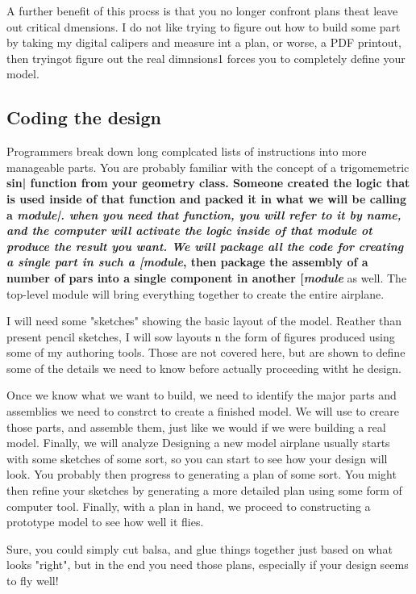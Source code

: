 A further benefit of this procss is that you no longer confront plans theat leave out critical dmensions. I do not like trying to figure out how to build some part by taking my digital calipers and measure int a plan, or worse, a  PDF printout, then tryingot figure out the real dimnsions1 \osc forces you to completely define your model.

\subsection{Coding the design}

Programmers break down long complcated lists of instructions into more manageable parts. You are probably familiar with the concept of a trigomemetric {\bf sin| function from your geometry class. Someone created the logic that is used inside of that function and packed it in what we will be calling a {\it module|. when you need that function, you will refer to it by name, and the computer will activate the logic inside of that module ot produce the result you want.  We will package all the code for creating a single part in such a [\it module}, then package the assembly of a number of pars into a single component in another [\it module} as well. The top-level {module} will bring everything together to create the entire airplane.

I will need some "sketches" showing the basic layout of the model. Reather than present pencil sketches, I will sow layouts n the form of figures produced using some of my authoring tools. Those are not covered here, but are shown to define some of the details we need to know before actually proceeding witht he design.

Once we know what we want to build, we need to identify the major parts and assemblies we need to constrct to create a finished model. We will use \osc to creare those parts, and assemble them, just like we would if we were building a real model. Finally, we will analyze
Designing a new model airplane usually starts with some sketches of some sort,
so you can start to see how your design will look.  You probably then
progress to generating a plan of some sort. You might then refine your sketches by
generating a more detailed plan using some form of
computer tool. Finally, with a plan in hand, we proceed to constructing a prototype model to see how well it flies.

Sure, you could simply cut balsa, and glue things together just based on what
looks "right", but in the  end you need those plans, especially if your design
seems to fly well!

